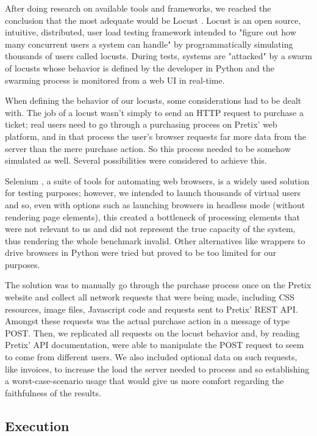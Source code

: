 \documentclass[12pt]{article}
\begin{document}
After doing research on available tools and frameworks, we reached the conclusion that the most adequate would be Locust \cite{locust}.
Locust is an open source, intuitive, distributed, user load testing framework intended to "figure out how many concurrent users a system can handle" by 
programmatically simulating thousands of users called locusts.
During tests, systems are "attacked" by a swarm of locusts whose behavior is defined by the developer in Python and the swarming process is monitored from a 
web UI in real-time. 

When defining the behavior of our locusts, some considerations had to be dealt with.
The job of a locust wasn't simply to send an HTTP request to purchase a ticket; real users need to go through a purchasing process on Pretix' web platform, and 
in that process the user's browser requests far more data from the server than the mere purchase action.
So this process needed to be somehow simulated as well.
Several possibilities were considered to achieve this.

Selenium \cite{selenium}, a suite of tools for automating web browsers, is a widely used solution for testing purposes; however, we intended to launch thousands 
of virtual users and so, even with options such as launching browsers in headless mode (without rendering page elements), this created a bottleneck of processing 
elements that were not relevant to us and did not represent the true capacity of the system, thus rendering the whole benchmark invalid.
Other alternatives like wrappers to drive browsers in Python were tried but proved to be too limited for our purposes.

The solution was to manually go through the purchase process once on the Pretix website and collect all network requests that were being made, including CSS 
resources, image files, Javascript code and requests sent to Pretix' REST API.
Amongst these requests was the actual purchase action in a message of type POST.
Then, we replicated all requests on the locust behavior and, by reading Pretix' API documentation, were able to manipulate the POST request to seem to come 
from different users.
We also included optional data on such requests, like invoices, to increase the load the server needed to process and so establishing a worst-case-scenario usage 
that would give us more comfort regarding the faithfulness of the results.

\subsection{Execution} \label{performance.execution} %
\end{document}
